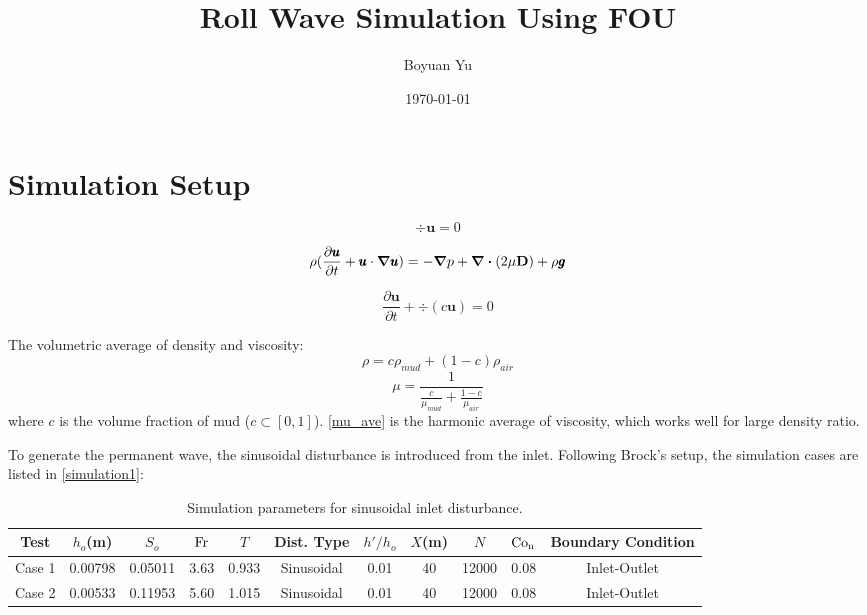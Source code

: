 \documentclass[a4paper]{article}
\title{Roll Wave Simulation Using FOU}
\author{
Boyuan Yu}
\date{\today}
\newcommand{\fr}{\rm{Fr}}
\begin{document}
\maketitle



\section{Simulation Setup}
\begin{equation}
	\div{\pmb{u}}=0
	\label{ns1}
\end{equation}

\begin{equation}
	\rho(\frac{\partial \pmb{u}}{\partial t}+\pmb{u} \cdot {\grad{\pmb{u}}})=-\grad{p}+\div{(2\mu \vb{D})}+\rho \pmb{g}
	\label{ns2}
\end{equation}

\begin{equation}
	\frac{\partial \pmb{u}}{\partial t}+\div{(c\pmb{u})}=0
	\label{ns3}
\end{equation}	

The volumetric average of density and viscosity:
\begin{equation}
	\rho = c\rho_{mud}+(1-c)\rho_{air}
	\label{c_ave}
\end{equation}
\begin{equation}
	\mu = \frac{1}{\frac{c}{\mu_{mud}}+\frac{1-c}{\mu_{air}}}
	\label{mu_ave}
\end{equation}
where $c$ is the volume fraction of mud ($c\subset [0,1]$). \autoref{mu_ave} is the harmonic  average of viscosity, which works well for large density ratio.

To generate the permanent wave, the sinusoidal disturbance is introduced from the inlet. Following Brock's setup, the simulation cases are listed in \autoref{simulation1}:
\begin{table}[htbp]
	\centering
	\caption{Simulation parameters for sinusoidal inlet disturbance.}
	\label{simulation1}
	\begin{threeparttable}
		\begin{tabular}{ccccccccccc}
			\toprule
			Test & $h_o$(m) & $S_o$ & $\fr$ & $T$ & Dist. Type & $h'/h_o$ & $X$(m) &$N$ &$\rm{Co_n}$&Boundary Condition \\
			\midrule
			Case 1  & 0.00798 & 0.05011 & 3.63 & 0.933 &Sinusoidal & 0.01 & 40 &12000 & 0.08&Inlet-Outlet \\
			Case 2 & 0.00533 & 0.11953 & 5.60 & 1.015 & Sinusoidal & 0.01 & 40 &12000 &0.08&Inlet-Outlet\\
			\bottomrule    
		\end{tabular}

	\end{threeparttable}
\end{table}
\end{document}
